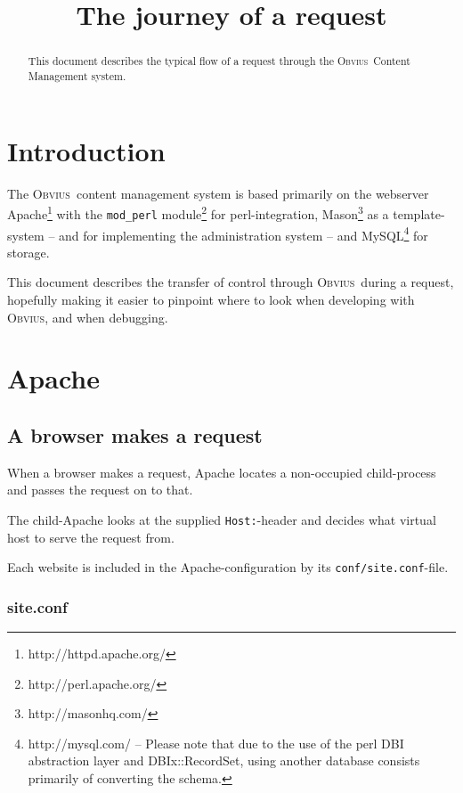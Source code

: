 \documentclass[a4paper,12pt]{article}
\title{\obvius\\{\Large The journey of a request}}
\date{}
\author{}
\newcommand{\obvius}{\textsc{Obvius}}
\newcommand{\modperl}{\texttt{mod\_perl}}
\begin{document}
\maketitle 

\begin{abstract}
  This document describes the typical flow of a request through the
  \obvius\ Content Management system.
\end{abstract}

\pagebreak
\tableofcontents
\pagebreak


\section{Introduction}

The \obvius\ content management system is based primarily on the
webserver Apache\footnote{http://httpd.apache.org/} with the {\modperl}
module\footnote{http://perl.apache.org/} for perl-integration,
Mason\footnote{http://masonhq.com/} as a template-system -- and for
implementing the administration system -- and
MySQL\footnote{http://mysql.com/ -- Please note
  that due to the use of the perl DBI abstraction layer and
  DBIx::RecordSet, using another database consists primarily of
  converting the schema.} for storage.

This document describes the transfer of control through \obvius\ during
a request, hopefully making it easier to pinpoint where to look when
developing with \obvius, and when debugging.


\section{Apache}

\subsection{A browser makes a request}

When a browser makes a request, Apache locates a non-occupied
child-process and passes the request on to that.

The child-Apache looks at the supplied \texttt{Host:}-header and
decides what virtual host to serve the request from.

Each website is included in the Apache-configuration by its
\texttt{conf/site.conf}-file.

\subsubsection{site.conf}
\end{document}
